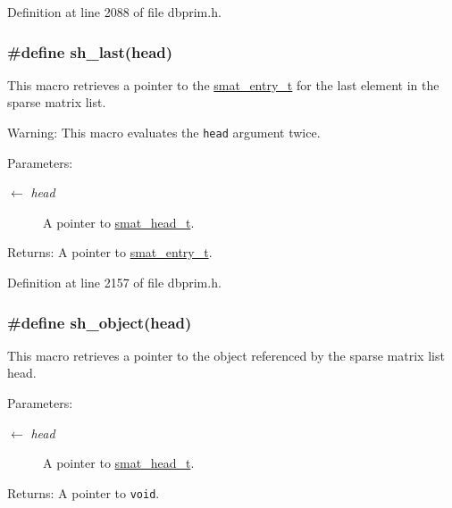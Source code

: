 Definition at line 2088 of file dbprim.h.\hypertarget{group__dbprim__smat_ga51}{
\subsubsection[sh\_\-last]{\setlength{\rightskip}{0pt plus 5cm}\#define sh\_\-last(head)}}
\label{group__dbprim__smat_ga51}


This macro retrieves a pointer to the \hyperlink{group__dbprim__smat_ga2}{smat\_\-entry\_\-t} for the last element in the sparse matrix list.

\begin{Desc}
\item[Warning:]This macro evaluates the {\tt head} argument twice.\end{Desc}
\begin{Desc}
\item[Parameters:]
\begin{description}
\item[\mbox{$\leftarrow$} {\em head}]A pointer to \hyperlink{group__dbprim__smat_ga1}{smat\_\-head\_\-t}.\end{description}
\end{Desc}
\begin{Desc}
\item[Returns:]A pointer to \hyperlink{group__dbprim__smat_ga2}{smat\_\-entry\_\-t}.\end{Desc}


Definition at line 2157 of file dbprim.h.\hypertarget{group__dbprim__smat_ga52}{
\subsubsection[sh\_\-object]{\setlength{\rightskip}{0pt plus 5cm}\#define sh\_\-object(head)}}
\label{group__dbprim__smat_ga52}


This macro retrieves a pointer to the object referenced by the sparse matrix list head.

\begin{Desc}
\item[Parameters:]
\begin{description}
\item[\mbox{$\leftarrow$} {\em head}]A pointer to \hyperlink{group__dbprim__smat_ga1}{smat\_\-head\_\-t}.\end{description}
\end{Desc}
\begin{Desc}
\item[Returns:]A pointer to {\tt void}.\end{Desc}


